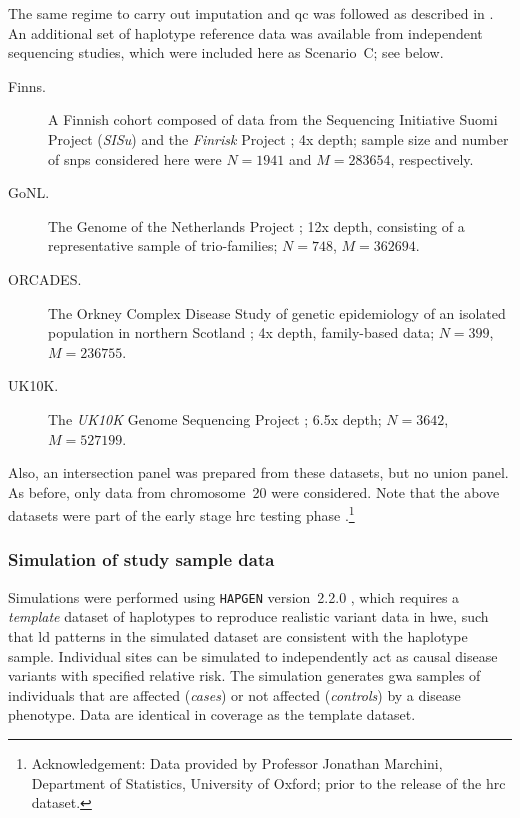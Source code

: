 The same regime to carry out imputation and \gls{qc} was followed as described in .
An additional set of haplotype reference data was available from  independent sequencing studies, which were included here as Scenario~C; see below.
\begin{description}
	\item[Finns.] A Finnish cohort composed of data from the Sequencing Initiative Suomi Project (\emph{SISu}) and the \emph{Finrisk} Project \citep{Vartiainen:2010eb,Pajunen:2010ft,Lim:2014ir,Borodulin:2015bs}; 4x depth; sample size and number of \glspl{snp} considered here were ${N=\num{1941}}$ and ${M=\num{283654}}$, respectively.
	\item[GoNL.] The Genome of the Netherlands Project \citep{Boomsma:2013hf, Deelen:2014dq, GenomeoftheNetherlandsConsortium:2014gs}; 12x depth, consisting of a representative sample of  trio-families; ${N=\num{748}}$, ${M=\num{362694}}$.
	\item[ORCADES.] The Orkney Complex Disease Study of genetic epidemiology of an isolated population in northern Scotland \citep{McQuillan:2008fz}; 4x depth, family-based data; ${N=\num{399}}$, ${M=\num{236755}}$.
	\item[UK10K.] The \emph{UK10K} Genome Sequencing Project \citep{UKKConsortium:2015ii}; 6.5x depth; ${N=\num{3642}}$, ${M=\num{527199}}$.
\end{description}
Also, an intersection panel was prepared from these  datasets, but no union panel.
As before, only data from chromosome~20 were considered.
Note that the above datasets were part of the early stage \gls{hrc} testing phase \citep{McCarthy:2016gs}.\footnote{Acknowledgement: Data provided by Professor Jonathan Marchini, Department of Statistics, University of Oxford; prior to the release of the \gls{hrc} dataset.}


%
\subsubsection{Simulation of study sample data}
%

Simulations were performed using \texttt{HAPGEN} version~2.2.0 \citep{Su:2011km}, which requires a \emph{template} dataset of haplotypes to reproduce realistic variant data in \gls{hwe}, such that \gls{ld} patterns in the simulated dataset are consistent with the haplotype sample.
Individual sites can be simulated to independently act as causal disease variants with specified relative risk.
The simulation generates  \gls{gwa} samples of individuals that are affected (\emph{cases}) or not affected (\emph{controls}) by a disease phenotype.
Data are identical in coverage as the template dataset.


